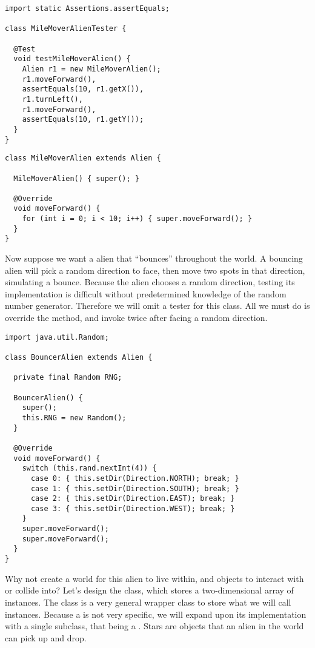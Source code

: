 \begin{lstlisting}[language=MyJava]
import static Assertions.assertEquals;

class MileMoverAlienTester {

  @Test
  void testMileMoverAlien() {
    Alien r1 = new MileMoverAlien();
    r1.moveForward(),
    assertEquals(10, r1.getX()),
    r1.turnLeft(),
    r1.moveForward(),
    assertEquals(10, r1.getY());
  }
}
\end{lstlisting}

\begin{lstlisting}[language=MyJava]
class MileMoverAlien extends Alien {

  MileMoverAlien() { super(); }

  @Override
  void moveForward() {
    for (int i = 0; i < 10; i++) { super.moveForward(); }
  }
}
\end{lstlisting}

Now suppose we want a alien that ``bounces'' throughout the world. 
A bouncing alien will pick a random direction to face, then move two spots in that direction, simulating a bounce. 
Because the alien chooses a random direction, testing its implementation is difficult without predetermined knowledge of the random number generator. 
Therefore we will omit a tester for this class. 
All we must do is override the  method, and invoke  twice after facing a random direction.

\begin{lstlisting}[language=MyJava]
import java.util.Random;

class BouncerAlien extends Alien {

  private final Random RNG;

  BouncerAlien() {
    super();
    this.RNG = new Random();
  }

  @Override
  void moveForward() {
    switch (this.rand.nextInt(4)) {
      case 0: { this.setDir(Direction.NORTH); break; }
      case 1: { this.setDir(Direction.SOUTH); break; }
      case 2: { this.setDir(Direction.EAST); break; }
      case 3: { this.setDir(Direction.WEST); break; }
    }
    super.moveForward();
    super.moveForward();
  }
}
\end{lstlisting}

Why not create a world for this alien to live within, and objects to interact with or collide into? 
Let's design the  class, which stores a two-dimensional array of  instances.
The  class is a very general wrapper class to store what we will call  instances. 
Because a  is not very specific, we will expand upon its implementation with a single subclass, that being a . 
Stars are objects that an alien in the world can pick up and drop. 

